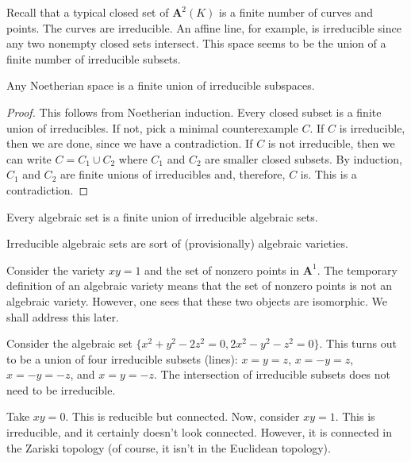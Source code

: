 \documentclass[11pt, oneside,margin=1in]{article}
\begin{document}
Recall that a typical closed set of $\mathbf{A}^2(K)$ is a finite number of curves and points. The curves are irreducible. An affine line, for example, is irreducible since any two nonempty closed sets intersect. This space seems to be the union of a finite number of irreducible subsets.

\begin{theorem}[ ]\label{}\index{}\text{}
Any Noetherian space is a finite union of irreducible subspaces.
\end{theorem}

\begin{proof}
This follows from Noetherian induction. Every closed subset is a finite union of irreducibles. If not, pick a minimal counterexample $C$. If $C$ is irreducible, then we are done, since we have a contradiction. If $C$ is not irreducible, then we can write $C=C_1\cup C_2$ where $C_1$ and $C_2$ are smaller closed subsets. By induction, $C_1$ and $C_2$ are finite unions of irreducibles and, therefore, $C$ is. This is a contradiction. 
\end{proof}

\begin{corollary}[ ]\label{}\text{}
Every algebraic set is a finite union of irreducible algebraic sets.
\end{corollary}

\begin{remark}
	Irreducible algebraic sets are sort of (provisionally) algebraic varieties.
\end{remark}

\begin{example}[ ]\label{}\text{}
Consider the variety $xy=1$ and the set of nonzero points in $\mathbf{A}^1$. The temporary definition of an algebraic variety means that the set of nonzero points is not an algebraic variety. However, one sees that these two objects are isomorphic. We shall address this later.
\end{example}

\begin{example}[ ]\label{}\text{}
Consider the algebraic set $\{x^2+y^2 -2z^2=0, 2x^2 - y^2 - z^2=0\}$. This turns out to be a union of four irreducible subsets (lines): $x=y=z$, $x=-y=z$, $x=-y=-z$, and $x=y=-z$. The intersection of irreducible subsets does not need to be irreducible.
\end{example}

\begin{example}[ ]\label{}\text{}
Take $xy=0$. This is reducible but connected. Now, consider $xy=1$. This is irreducible, and it certainly doesn't look connected. However, it is connected in the Zariski topology (of course, it isn't in the Euclidean topology).
\end{example}
\end{document}
